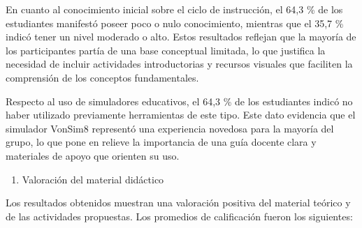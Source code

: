 \documentclass[12pt,oneside]{templates/unerthesis}
\providecommand{\tightlist}{%
  \setlength{\itemsep}{0pt}\setlength{\parskip}{0pt}}
\begin{document}
En cuanto al conocimiento inicial sobre el ciclo de instrucción, el 64,3 \% de los estudiantes manifestó poseer poco o nulo conocimiento, mientras que el 35,7 \% indicó tener un nivel moderado o alto. Estos resultados reflejan que la mayoría de los participantes partía de una base conceptual limitada, lo que justifica la necesidad de incluir actividades introductorias y recursos visuales que faciliten la comprensión de los conceptos fundamentales.

Respecto al uso de simuladores educativos, el 64,3 \% de los estudiantes indicó no haber utilizado previamente herramientas de este tipo. Este dato evidencia que el simulador VonSim8 representó una experiencia novedosa para la mayoría del grupo, lo que pone en relieve la importancia de una guía docente clara y materiales de apoyo que orienten su uso.

\begin{enumerate}
\def\labelenumi{\arabic{enumi}.}
\setcounter{enumi}{1}
\tightlist
\item
  Valoración del material didáctico
\end{enumerate}

Los resultados obtenidos muestran una valoración positiva del material teórico y de las actividades propuestas. Los promedios de calificación fueron los siguientes:

\begin{table}[!h]
\centering
\caption{\label{tab:tablaaspectos}Valoración de aspectos clave del simulador VonSim8}
\centering
{}
\end{table}
\end{document}
